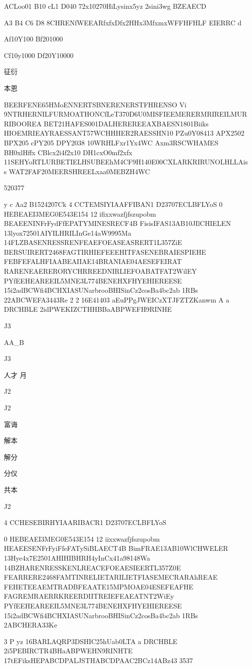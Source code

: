 \documentclass[12pt,a4paper]{ctexart}
\begin{document}
ACLoo01 B10 cL1 D040
72x10270HiLysinx5yz 2sini3wg BZEAECD

A3 B4 C6 D8
8CHRENfWEEARfxfxDfx2HHx3MfxmxWFFHFHLF
EIERRC d

Af10Y100 Bf201000

Cf10y1000 Df20Y10000

征衍

本恩

BEERFENE65HMoENNERTSBNERENERSTFHRENSO
Vi
9NTRHERNILFURMOATHONCfLeT370D6U0MISFIEEMERERMRIREILMURRIBOOREA
BET21HAFES001DALHEREREEAXBAESN1801Biiks
HIOEMRIEAYRAESSANT57WCHHHER2RAESSHN10
PZu0Y08413
APX2502 BPX205
cPY205 DPY2038
10WRHLFxr1Yx4WC
Axm3RSCWHAMES BH0xlHffx
CBlcx2i4f2x10 DH1cxO0mf2xfx
11SEHYoRTLURBETIELHSUBEEhM4CF9H140E00CXLARKRIRUNOLHLLAiss
WAT2FAF20MEERSHREELxaa0MEBZH4WC

520377


y
   c
Aa2 B1524207Ck
4
CCTEMSIYIAAFFIBAN1 D23707ECLBFLYoS
0
HEBEAEI3MEG0E543E154
12 ifixxwazfjfszupobm BEAEENINFrFydFfEPATYMINESRECF4B
FisisIFAS13AB10JIlCHIELEN
13lyox72501AIYILHRILInGe14aW9995Ma
14FLZBASENRESSRENFEAEFOEASEASRERT1L357ZiE
BERSUIRERT2468FAGTIRHIEFEEEHITFASENEBRAIESPIEHE
FEBFEFALHFIAABEAIIAE14BRANIAE04AESEFEIRAT
RARENEAERERORYCHRREEDNIRLIEFOABATFAT2WilEY
PYfEEHEAREEIL5MNE3L774BENEHXFHYEHIEREESE
15i2adBCWfi4BCHXIASUNarbrooBHISinCz2cosBa4bc2ab
1RBs
22ABCWEFA3443Re
2 2
16E41403 aEuPPgJWEICzXTJFZTZKanwm A
a
DRCHBLE
2idPWEKIZCTHHBBaABPWEFH9RINHE

J3

AA\_B

J3

人才 月

J2

J2

富诲

解本

解分

分仪

共本

J2

4
CCHESEBIRHYIAARIBACR1 D23707ECLBFLYoS

0
HEBEAEI3MEG0E543E154
12 iixxwazfjfszupobm HEAEESENFrFyiFfeFATySiBLAECT4B
BimFRAE13AB10WlCHWELER
13Hye4x7E2501AHIHIBHRH4yInCx41a98148Wa
14BZHARENRESSKENLREACEFOEAESIEERTL357Z0E
FEARRERE2468FAMTINRELIETARILIETFIASEMECRARAhREAE
FEHETEEAEMTRADBFEAATE15MPMOAE04ESEFEAFHE
FAGREMRAERRKREERDIITREIEFEAEATNT2WiEy
PYfEEHEAREEIL5MNE3L774BENEHXFHYEHIEREESE
15i2adBCWfi4BCHXIASUNarbrooBHISinCz2cosBa4bc2ab
1RBs
2ABCHERA33Ke

3 P yz
16BARLAQRP3DSHIC25hUab0LTA
a
DRCHBLE
2i5PEBIRCTR4BHaABPWEHN9RINHTE
17tEFiksHEPABCDPALJSTHABCDPAAC2BCz14ABz43
3537
\end{document}
